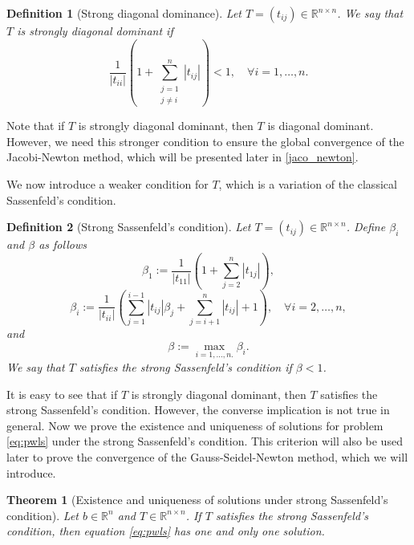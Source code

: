 \documentclass[11pt]{article}
\newtheorem{theorem}{Theorem}[section]
\newtheorem{definition}{Definition}[section]
\newcommand{\R}{\mathbb R}
\begin{document}
\begin{definition}[Strong diagonal dominance]\label{strong_diag_cond}
Let $T=(t_{ij})\in\R^{n\times n}$. We say that $T$ is strongly diagonal dominant if
$$ \frac{1}{| t_{ii} |}\left(1+\sum_{\substack{j=1 \\ j \neq i}}^n |t_{ij}| \right) <1,\quad\forall i=1,\dots,n.$$
\end{definition}

Note that if $T$ is strongly diagonal dominant, then $T$ is diagonal dominant. However, we need this stronger condition to ensure the global convergence of the Jacobi-Newton method, which will be presented later in \eqref{jaco_newton}. 

We now introduce a weaker condition for $T$, which is a variation of the classical Sassenfeld's condition. 

\begin{definition}[Strong Sassenfeld's condition]\label{strong_sassen_cond}
Let $T=(t_{ij})\in\R^{n\times n}$. Define $\beta_i$ and $\beta$ as follows
\begin{equation}\label{beta-1} \beta_1 := \frac{1}{| t_{11} |}\left(1+\sum_{j=2}^n |t_{1j}| \right),\end{equation}
\begin{equation}\label{beta-i} \beta_i := \frac{1}{| t_{ii} |}\left(\sum_{j=1}^{i-1}|t_{ij}|\beta_j+\sum_{j=i+1}^n|t_{ij}| + 1\right),\quad\forall i=2,\dots,n,\end{equation}
and
$$ \beta := \max_{i=1,\dots,n.}\beta_i. $$ We say that $T$ satisfies the strong Sassenfeld's condition if $\beta < 1$.
\end{definition}
It is easy to see that if $T$ is strongly diagonal dominant, then $T$ satisfies the strong Sassenfeld's condition. However, the converse implication is not true in general. Now we prove the existence and uniqueness of solutions for problem \eqref{eq:pwls} under the strong Sassenfeld's condition. This criterion will also be used later to prove the convergence of the Gauss-Seidel-Newton method, which we will introduce.

\begin{theorem}[Existence and uniqueness of solutions under strong Sassenfeld's condition]\label{exis_uniq_sassenf}
Let $b \in \R^n$ and $T\in\R^{n\times n}$. If $T$ satisfies the strong Sassenfeld's condition, then equation \eqref{eq:pwls} has one and only one solution.
\end{theorem}
\end{document}

